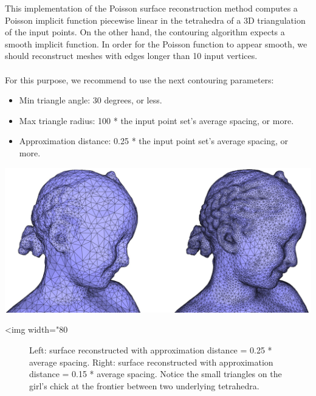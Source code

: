 This implementation of the Poisson surface reconstruction method computes a Poisson implicit function
piecewise linear in the tetrahedra of a 3D triangulation of the input points.
On the other hand, the contouring algorithm  expects a smooth implicit function.
In order for the Poisson function to appear smooth, we should reconstruct meshes with edges longer than 10 input vertices.\\
\\
For this purpose, we recommend to use the next contouring parameters:
\begin{itemize}
\item Min triangle angle: 30 degrees, or less.
\item Max triangle radius: 100 * the input point set's average spacing, or more.
\item Approximation distance: 0.25 * the input point set's average spacing, or more.
\end{itemize}

\begin{center}
    \label{Surface_reconstruction_points_3-fig-contouring_bad}
    \begin{ccTexOnly}
      \includegraphics[width=1.0\textwidth]{Surface_reconstruction_points_3/contouring_bad} %
    \end{ccTexOnly}
    \begin{ccHtmlOnly}
        <img width="80%
    \end{ccHtmlOnly}
    \begin{figure}[h]
        \caption{Left: surface reconstructed with approximation distance = 0.25 * average spacing.
                 Right: surface reconstructed with approximation distance = 0.15 * average spacing.
                 Notice the small triangles on the girl's chick at the frontier between two underlying tetrahedra.}
    \end{figure}
\end{center}




